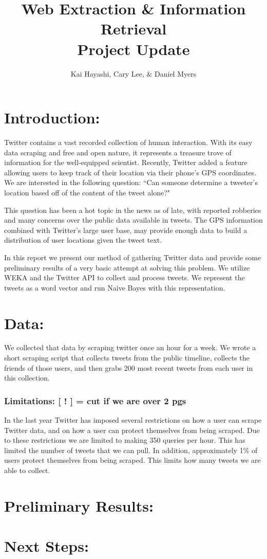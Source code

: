 \documentclass[12pt]{article}
\title{Web Extraction \& Information Retrieval \\ Project Update}
\author{Kai Hayashi, Cary Lee, \& Daniel Myers}
\date{}                                           %
\begin{document}
\maketitle
\section*{Introduction:}
Twitter contains a vast recorded collection of human interaction. With its easy data scraping and free and open nature, it represents a treasure trove of information for the well-equipped scientist. Recently, Twitter added a feature allowing users to keep track of their location via their phone's GPS coordinates. We are interested in the following question: ``Can someone determine a tweeter's location based off of the content of the tweet alone?"

This question has been a hot topic in the news as of late, with reported robberies and many concerns over the public data available in tweets. The GPS information combined with Twitter's large user base, may provide enough data to build a distribution of user locations given the tweet text. 

In this report we present our method of gathering Twitter data and provide some preliminary results of a very basic attempt at solving this problem. We utilize WEKA and the Twitter API to collect and process tweets. We represent the tweets as a word vector and run Naive Bayes with this representation.

\section*{Data:}
We collected that data by scraping twitter once an hour for a week. We wrote a short scraping script that collects tweets from the public timeline, collects the friends of those users, and then grabs 200 most recent tweets from each user in this collection. 

\subsubsection*{Limitations: [ ! ] = cut if we are over 2 pgs}
In the last year Twitter has imposed several restrictions on how a user can scrape Twitter data, and on how a user can protect themselves from being scraped. Due to these restrictions we are limited to making 350 queries per hour. This has limited the number of tweets that we can pull. In addition, approximately 1\% of users protect themselves from being scraped. This limits how many tweets we are able to collect. 

\section*{Preliminary Results:}


\section*{Next Steps:}
\end{document}

